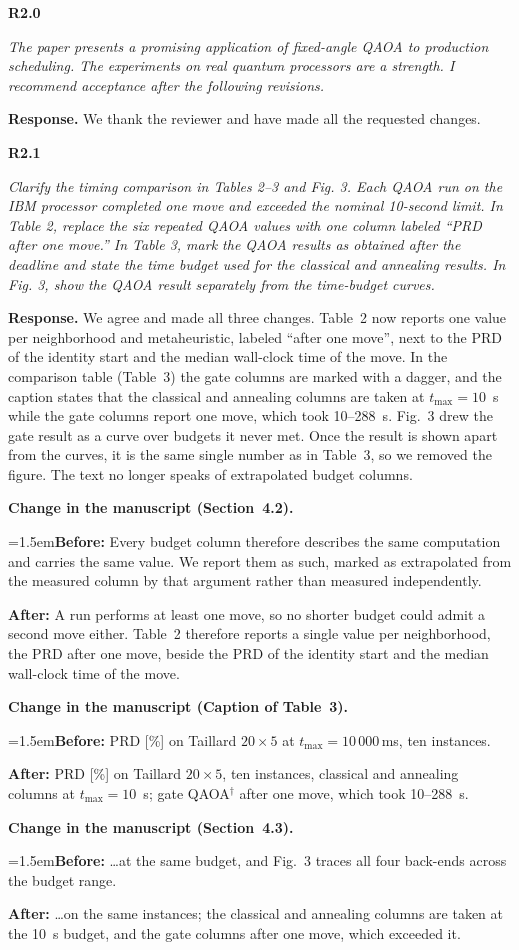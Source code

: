 \documentclass[11pt]{article}
\newenvironment{rc}[1]{\par\medskip\noindent\textbf{#1}\par\nopagebreak\noindent\itshape\ignorespaces}{\par}
\newcommand{\answer}[1]{\par\smallskip\noindent\textbf{Response.} #1\par}
\newcommand{\change}[3]{\par\smallskip\noindent\textbf{Change in the manuscript (#1).}\par
  {\leftskip=1.5em\noindent\textbf{Before:} #2\par\noindent\textbf{After:} #3\par}}
\begin{document}
\begin{rc}{R2.0}
The paper presents a promising application of fixed-angle QAOA to production scheduling. The experiments on real quantum processors are a strength. I recommend acceptance after the following revisions.
\end{rc}
\answer{We thank the reviewer and have made all the requested changes.}

\begin{rc}{R2.1}
Clarify the timing comparison in Tables 2--3 and Fig. 3. Each QAOA run on the IBM processor completed one move and exceeded the nominal 10-second limit. In Table 2, replace the six repeated QAOA values with one column labeled ``PRD after one move.'' In Table 3, mark the QAOA results as obtained after the deadline and state the time budget used for the classical and annealing results. In Fig. 3, show the QAOA result separately from the time-budget curves.
\end{rc}
\answer{We agree and made all three changes. Table~2 now reports one value per neighborhood and metaheuristic, labeled ``after one move'', next to the PRD of the identity start and the median wall-clock time of the move. In the comparison table (Table~3) the gate columns are marked with a dagger, and the caption states that the classical and annealing columns are taken at $t_{\max}=10$~s while the gate columns report one move, which took 10--288~s. Fig.~3 drew the gate result as a curve over budgets it never met. Once the result is shown apart from the curves, it is the same single number as in Table~3, so we removed the figure. The text no longer speaks of extrapolated budget columns.}
\change{Section~4.2}{Every budget column therefore describes the same computation and carries the same value. We report them as such, marked as extrapolated from the measured column by that argument rather than measured independently.}{A run performs at least one move, so no shorter budget could admit a second move either. Table~2 therefore reports a single value per neighborhood, the PRD after one move, beside the PRD of the identity start and the median wall-clock time of the move.}
\change{Caption of Table~3}{PRD [\%] on Taillard $20\times5$ at $t_{\max}=10\,000$\,ms, ten instances.}{PRD [\%] on Taillard $20\times5$, ten instances, classical and annealing columns at $t_{\max}=10$~s; gate QAOA$^{\dagger}$ after one move, which took 10--288~s.}
\change{Section~4.3}{\ldots at the same budget, and Fig.~3 traces all four back-ends across the budget range.}{\ldots on the same instances; the classical and annealing columns are taken at the 10~s budget, and the gate columns after one move, which exceeded it.}
\end{document}
